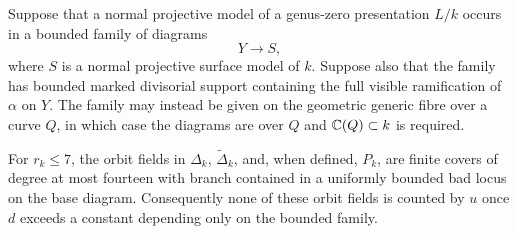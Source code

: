 \begin{lemma}\label{sf:residue-bound}
Suppose that a normal projective model of a genus-zero presentation
$L/k$ occurs in
a bounded family of diagrams
\[
                  Y\longrightarrow S,
\]
where $S$ is a normal projective surface model of $k$.  Suppose also
that the family has
bounded marked divisorial support containing the full visible
ramification of $\alpha$ on $Y$.  The family may instead be given on
the geometric generic fibre over a curve $Q$, in which case the
diagrams are over $Q$ and $\mathbb C(Q)\subset k$ is required.

For $r_k\leq7$, the orbit fields in $\Delta_k$, $\widetilde\Delta_k$,
and, when defined, $P_k$, are finite covers of degree at most fourteen
with branch contained in a uniformly bounded bad locus on the base
diagram.  Consequently none of these orbit fields is counted by $u$
once $d$ exceeds a constant depending only on the bounded family.
\end{lemma}

